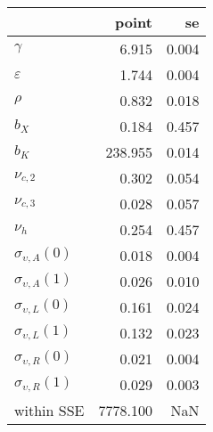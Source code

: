 \begin{tabular}{lrr}
\toprule
{} &     point &     se \\
\midrule
$\gamma$                 &     6.915 &  0.004 \\
$\varepsilon$            &     1.744 &  0.004 \\
$\rho$                   &     0.832 &  0.018 \\
$b_X$                    &     0.184 &  0.457 \\
$b_K$                    &   238.955 &  0.014 \\
$\nu_{c,2}$              &     0.302 &  0.054 \\
$\nu_{c,3}$              &     0.028 &  0.057 \\
$\nu_{h}$                &     0.254 &  0.457 \\
$\sigma_{\upsilon,A}(0)$ &     0.018 &  0.004 \\
$\sigma_{\upsilon,A}(1)$ &     0.026 &  0.010 \\
$\sigma_{\upsilon,L}(0)$ &     0.161 &  0.024 \\
$\sigma_{\upsilon,L}(1)$ &     0.132 &  0.023 \\
$\sigma_{\upsilon,R}(0)$ &     0.021 &  0.004 \\
$\sigma_{\upsilon,R}(1)$ &     0.029 &  0.003 \\
within SSE               &  7778.100 &    NaN \\
\bottomrule
\end{tabular}
